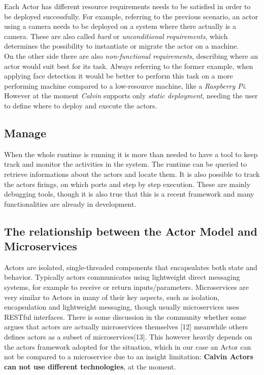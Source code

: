 \begin{itemize}
  Each Actor has different resource requirements needs to be satisfied in order to be
  deployed successfully. For example, referring to the previous scenario, an actor
  using a camera needs to be deployed on a system where there actually is a camera. These
  are also called \textit{hard} or \textit{unconditional requirements}, which determines
  the possibility to instantiate or migrate the actor on a machine. \\
  On the other side there are also \textit{non-functional requirements}, describing where
  an actor would suit best for its task. Always referring to the former example, when applying
  face detection it would be better to perform this task on a more performing machine compared to
  a low-resource machine, like a \textit{Raspberry Pi}.\\
  However at the moment \textit{Calvin} supports only \textit{static deployment}, needing the user
  to define where to deploy and execute the actors.

\subsection{Manage}
  When the whole runtime is running it is more than needed to have a tool to keep
  track and monitor the activities in the system. The runtime can be queried to retrieve
  informations about the actors and locate them. It is also possible to track
  the actors firings, on which ports and step by step execution. These are mainly
  debugging tools, though it is also true that this is a recent framework and many
  functionalities are already in development.


\subsection{The relationship between the Actor Model and Microservices}
Actors are isolated, single-threaded components that encapsulates both state and behavior.
Typically actors communicates using lightweight direct messaging systems, for example
to receive or return inputs/parameters. Microservices are very similar to Actors in many
of their key aspects, such as isolation, encapsulation and lightweight messaging, though
usually microservices uses RESTful interfaces. There is some discussion
in the community whether some argues that actors are actually microservices
themselves [12] meanwhile others defines actors as a subset of microservices[13].
This however heavily depends on the actors framework adopted for the situation, which in our
case an Actor can not be compared to a microservice due to an insight limitation: \textbf{Calvin Actors can not
use different technologies}, at the moment.


\end{itemize}
